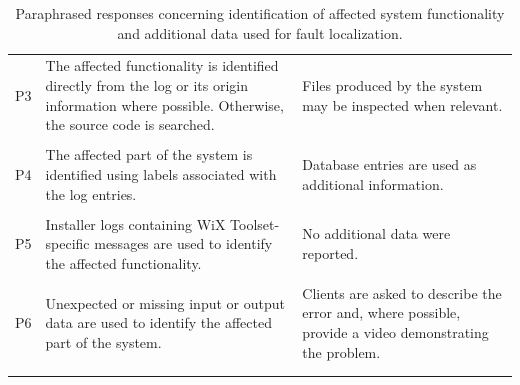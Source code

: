 \begin{longtable}{
    @{}
    >{\centering\arraybackslash}p{}
    >{\RaggedRight\arraybackslash}p{}
    >{\RaggedRight\arraybackslash}p{}
    @{}
}
P3 &
The affected functionality is identified directly from the log or its
origin information where possible. Otherwise, the source code is
searched. &
Files produced by the system may be inspected when relevant.
\\\\[0.1em]

P4 &
The affected part of the system is identified using labels associated
with the log entries. &
Database entries are used as additional information.
\\\\[0.1em]

P5 &
Installer logs containing WiX Toolset-specific messages are used to
identify the affected functionality. &
No additional data were reported.
\\\\[0.1em]

P6 &
Unexpected or missing input or output data are used to identify the
affected part of the system. &
Clients are asked to describe the error and, where possible, provide
a video demonstrating the problem.
\\\\
\caption{Paraphrased responses concerning identification of affected
system functionality and additional data used for fault localization.}
\label{tab:appendix-fault-identification}
\end{longtable}
\endgroup


